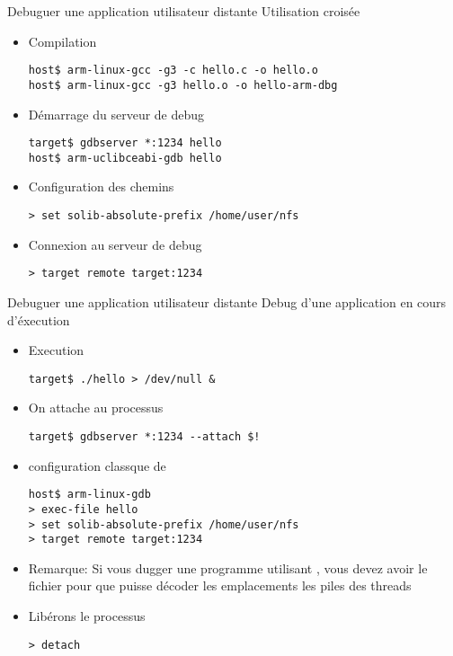 \begin{frame}[fragile=singleslide]{Debuguer une application utilisateur distante}
  Utilisation croisée
  \begin{itemize}
  \item Compilation
    \begin{lstlisting}
host$ arm-linux-gcc -g3 -c hello.c -o hello.o
host$ arm-linux-gcc -g3 hello.o -o hello-arm-dbg
    \end{lstlisting}
  \item Démarrage du serveur de debug
    \begin{lstlisting}
target$ gdbserver *:1234 hello
host$ arm-uclibceabi-gdb hello
    \end{lstlisting}
  \item Configuration des chemins
    \begin{lstlisting}
> set solib-absolute-prefix /home/user/nfs
    \end{lstlisting}
  \item Connexion au serveur de debug
    \begin{lstlisting}
> target remote target:1234
    \end{lstlisting}
  \end{itemize}
\end{frame}

\begin{frame}[fragile=singleslide]{Debuguer une application utilisateur distante}
  Debug d'une application en cours d'éxecution
  \begin{itemize}
  \item Execution
    \begin{lstlisting}
target$ ./hello > /dev/null & 
    \end{lstlisting}  
  \item On attache  au processus
    \begin{lstlisting}
target$ gdbserver *:1234 --attach $!
    \end{lstlisting}  
  \item configuration classque de 
    \begin{lstlisting}
host$ arm-linux-gdb
> exec-file hello
> set solib-absolute-prefix /home/user/nfs
> target remote target:1234
    \end{lstlisting}  
  \item   Remarque:   Si   vous   dugger   une   programme   utilisant
    ,     vous     devez     avoir     le     fichier
      pour   que    puisse   décoder  les
    emplacements les piles des threads
  \item Libérons le processus
    \begin{lstlisting}
> detach
    \end{lstlisting}  
  \end{itemize}
\end{frame}

